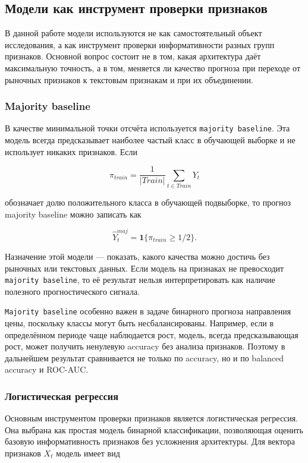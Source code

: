 \subsection{Модели как инструмент проверки признаков}

В данной работе модели используются не как самостоятельный объект исследования, а как инструмент проверки информативности разных групп признаков. Основной вопрос состоит не в том, какая архитектура даёт максимальную точность, а в том, меняется ли качество прогноза при переходе от рыночных признаков к текстовым признакам и при их объединении.

\subsubsection{Majority baseline}

В качестве минимальной точки отсчёта используется \texttt{majority baseline}. Эта модель всегда предсказывает наиболее частый класс в обучающей выборке и не использует никаких признаков. Если

\[
\pi_{train} = \frac{1}{|Train|}\sum_{t \in Train} Y_t
\]

обозначает долю положительного класса в обучающей подвыборке, то прогноз majority baseline можно записать как

\[
\widehat{Y}_{t}^{maj} = \mathbf{1}\{\pi_{train} \geq 1/2\}.
\]

Назначение этой модели --- показать, какого качества можно достичь без рыночных или текстовых данных. Если модель на признаках не превосходит \texttt{majority baseline}, то её результат нельзя интерпретировать как наличие полезного прогностического сигнала.

\texttt{Majority baseline} особенно важен в задаче бинарного прогноза направления цены, поскольку классы могут быть несбалансированы. Например, если в определённом периоде чаще наблюдается рост, модель, всегда предсказывающая рост, может получить ненулевую accuracy без анализа признаков. Поэтому в дальнейшем результат сравнивается не только по accuracy, но и по balanced accuracy и ROC-AUC.

\subsubsection{Логистическая регрессия}

Основным инструментом проверки признаков является логистическая регрессия. Она выбрана как простая модель бинарной классификации, позволяющая оценить базовую информативность признаков без усложнения архитектуры. Для вектора признаков $X_t$ модель имеет вид

